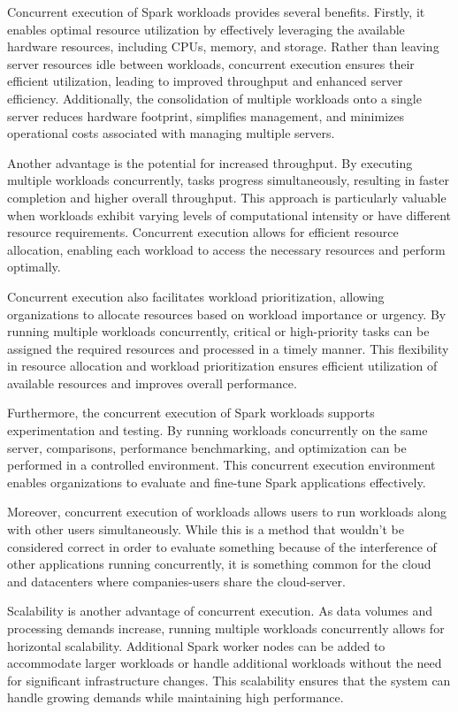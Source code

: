 \documentclass[twocolumn,10pt]{asme2e}
\begin{document}
Concurrent execution of Spark workloads provides several benefits. Firstly, it enables optimal resource utilization by effectively leveraging the available hardware resources, including CPUs, memory, and storage. Rather than leaving server resources idle between workloads, concurrent execution ensures their efficient utilization, leading to improved throughput and enhanced server efficiency. Additionally, the consolidation of multiple workloads onto a single server reduces hardware footprint, simplifies management, and minimizes operational costs associated with managing multiple servers.

Another advantage is the potential for increased throughput. By executing multiple workloads concurrently, tasks progress simultaneously, resulting in faster completion and higher overall throughput. This approach is particularly valuable when workloads exhibit varying levels of computational intensity or have different resource requirements. Concurrent execution allows for efficient resource allocation, enabling each workload to access the necessary resources and perform optimally.

Concurrent execution also facilitates workload prioritization, allowing organizations to allocate resources based on workload importance or urgency. By running multiple workloads concurrently, critical or high-priority tasks can be assigned the required resources and processed in a timely manner. This flexibility in resource allocation and workload prioritization ensures efficient utilization of available resources and improves overall performance.

Furthermore, the concurrent execution of Spark workloads supports experimentation and testing. By running workloads concurrently on the same server, comparisons, performance benchmarking, and optimization can be performed in a controlled environment. This concurrent execution environment enables organizations to evaluate and fine-tune Spark applications effectively.

Moreover, concurrent execution of workloads allows users to run workloads along with other users simultaneously. While this is a method that wouldn't be considered correct in order to evaluate something because of the interference of other applications running concurrently, it is something common for the cloud and datacenters where companies-users share the cloud-server.

Scalability is another advantage of concurrent execution. As data volumes and processing demands increase, running multiple workloads concurrently allows for horizontal scalability. Additional Spark worker nodes can be added to accommodate larger workloads or handle additional workloads without the need for significant infrastructure changes. This scalability ensures that the system can handle growing demands while maintaining high performance.
\end{document}
